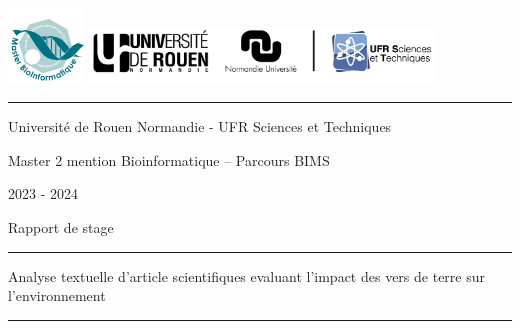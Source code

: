 \documentclass{book}
\begin{document}

\newpage
\thispagestyle{empty}
\vspace{-5cm}
\includegraphics[height=2cm]{univ.png}
\hfill
\includegraphics[height=1.5cm]{URN_NU_ST.jpg}

\vspace{0.5cm}
\hrule
\vspace{0.5cm}

\begin{center}
    \large{Université de Rouen Normandie - UFR Sciences et Techniques}
\end{center}

\begin{center}
    \large{Master 2 mention Bioinformatique – Parcours BIMS}
\end{center}

\begin{center}
    \large{2023 - 2024}
\end{center}

\vspace{1cm}

\begin{center}
    \Large{Rapport de stage}
\end{center}

\begin{center}
    \vspace{1cm}
    \hrule
    \vspace{1cm}
    \huge{Analyse textuelle d'article scientifiques evaluant l'impact des vers
        de terre sur l'environnement }
    \vspace{1cm}
    \hrule
    \vspace{1cm}
\end{center}
\end{document}
